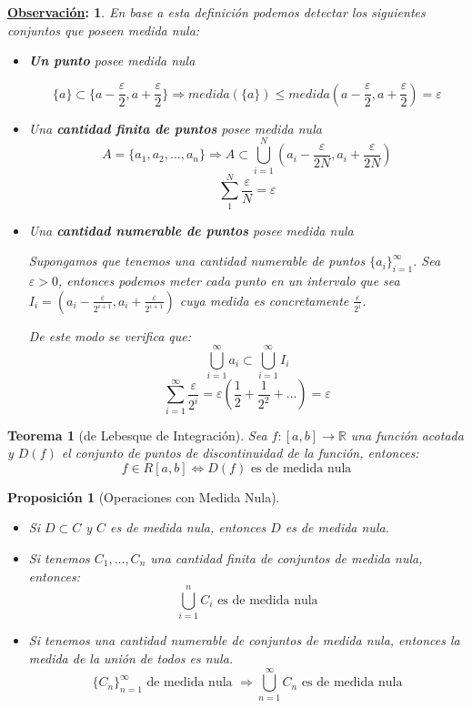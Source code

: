 \documentclass[10pt,a4paper,openright]{book}
\theoremstyle{break}
\newtheorem*{theo}{Teorema}
\newtheorem*{prop}{Proposición}
\newtheorem*{obs}{\underline{Observación}:}
\begin{document}
\begin{obs}
En base a esta definición podemos detectar los siguientes conjuntos que poseen medida nula:
\begin{itemize}
\item \textbf{Un punto} posee medida nula

$$\{a\}\subset \{a-\frac{\varepsilon}{2}, a +\frac{\varepsilon}{2}\}\Rightarrow medida(\{a\})\leq medida\left(a-\frac{\varepsilon}{2}, a +\frac{\varepsilon}{2}\right) = \varepsilon$$

\item Una \textbf{cantidad finita de puntos} posee medida nula
$$A = \{a_1, a_2,...,a_n\}\Rightarrow A \subset \bigcup^N_{i=1} \left(a_i - \frac{\varepsilon}{2N}, a_i + \frac{\varepsilon}{2N}\right)$$
$$\sum_{1}^{N} \frac{\varepsilon}{N} = \varepsilon$$

\item Una \textbf{cantidad numerable de puntos} posee medida nula

Supongamos que tenemos una cantidad numerable de puntos $\{a_i\}_{i=1}^\infty$. Sea $\varepsilon >0$, entonces podemos meter cada punto en un intervalo que sea $I_i=\left(a_i-\frac{\varepsilon}{2^{i+1}}, a_i + \frac{\varepsilon}{2^{i+1}}\right)$ cuya medida es concretamente $\frac{\varepsilon}{2^i}$.

De este modo se verifica que:
$$\bigcup^\infty_{i=1} a_i \subset \bigcup^\infty_{i=1} I_i$$
$$\sum_{i=1}^{\infty} \frac{\varepsilon}{2^i} = \varepsilon \left(\frac{1}{2} + \frac{1}{2^2} + \ldots\right) = \varepsilon $$
\end{itemize}
\end{obs}

\begin{theo}[de Lebesque de Integración]
Sea $f:[a,b]\rightarrow \mathbb R$ una función acotada y $D(f)$ el conjunto de puntos de discontinuidad de la función, entonces:
$$f\in R[a,b]\Leftrightarrow D(f) \mbox{ es de medida nula}$$
\end{theo}

\begin{prop}[Operaciones con Medida Nula]
\begin{itemize}
\item Si $D\subset C$ y $C$ es de medida nula, entonces $D$ es de medida nula.
\item Si tenemos $C_1, ..., C_n$ una cantidad finita de conjuntos de medida nula, entonces:
$$\bigcup_{i =1}^{n} C_i\mbox{ es de medida nula}$$
\item Si tenemos una cantidad numerable de conjuntos de medida nula, entonces la medida de la unión de todos es nula.
$$\{C_n\}_{n=1}^\infty\mbox{ de medida nula }\Rightarrow \bigcup_{n=1}^{\infty} C_n \mbox{ es de medida nula}$$
\end{itemize}
\end{prop}
\end{document}
